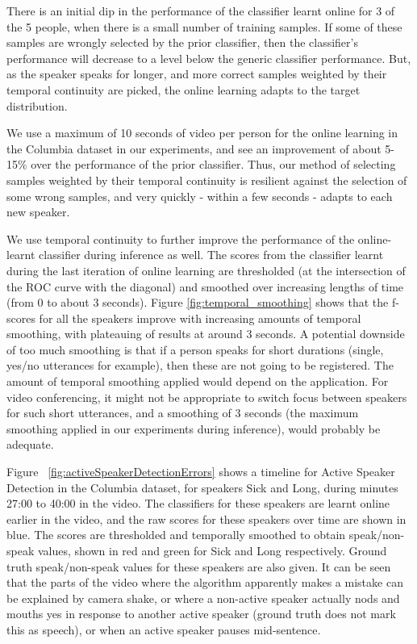 \documentclass[runningheads]{llncs}
\begin{document}
There is an initial dip in the performance of the classifier learnt online for 3 of the 5 people, when there is a small number of training samples. If some of these samples are wrongly selected by the prior classifier, 
then the classifier's performance will decrease to a level below the generic classifier performance. But, as the speaker speaks for longer, and more correct samples weighted by their temporal continuity are picked, the online learning adapts to the target distribution. 

We use a maximum of 10 seconds of video per person for the online learning in the Columbia dataset in our experiments, and see an improvement of about 5-15\% over the performance of the prior classifier. Thus, our method of selecting samples weighted by their temporal continuity is resilient against the selection of some wrong samples, and very quickly - within a few seconds - adapts to each new speaker.

We use temporal continuity to further improve the performance of the online-learnt classifier during inference as well. The scores from the classifier learnt during the last iteration of online learning are thresholded (at the intersection of the ROC curve with the diagonal) and smoothed over increasing lengths of time (from 0 to about 3 seconds). Figure \ref{fig:temporal_smoothing} shows that the f-scores for all the speakers improve with increasing amounts of temporal smoothing, with plateauing of results at around 3 seconds. A potential downside of too much smoothing is that if a person speaks for short durations (single, yes/no utterances for example), then these are not going to be registered. The amount of temporal smoothing applied would depend on the application. For video conferencing, it might not be appropriate to switch focus between speakers for such short utterances, and a smoothing of 3 seconds (the maximum smoothing applied in our experiments during inference), would probably be adequate.

Figure ~\ref{fig:activeSpeakerDetectionErrors} shows a timeline for Active Speaker Detection in the Columbia dataset, for speakers Sick and Long, during minutes 27:00 to 40:00 in the video. The classifiers for these speakers are learnt online earlier in the video, and the raw scores for these speakers over time are shown in blue. The scores are thresholded and temporally smoothed to obtain speak/non-speak values, shown in red and green for Sick and Long respectively. Ground truth speak/non-speak values for these speakers are also given. It can be seen that the parts of the video where the algorithm apparently makes a mistake can be explained by camera shake, or where a non-active speaker actually nods and mouths yes in response to another active speaker (ground truth does not mark this as speech), or when an active speaker pauses mid-sentence.
\end{document}
